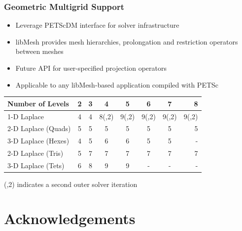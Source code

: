 \documentclass[mathserif]{beamer}
\begin{document}
\begin{frame}[fragile]
\frametitle{Geometric Multigrid Support}

\begin{itemize}

    \item Leverage PETScDM interface for solver infrastructure
    \item libMesh provides mesh hierarchies, prolongation and
        restriction operators between meshes
    \item Future API for user-specified projection operators
    \item Applicable to any libMesh-based application compiled with PETSc

\end{itemize}

      \begin{tabular}{l*{6}{c}r}
        Number of Levels  & 2 & 3 & 4 & 5 & 6  & 7 & 8 \\
        \hline
        1-D Laplace & 4 & 4 & 8(,2) & 9(,2) & 9(,2) & 9(,2) & 9(,2)\\
        2-D Laplace (Quads) & 5 & 5 & 5 & 5 & 5 & 5 & 5  \\
        3-D Laplace (Hexes) & 4 & 5 & 6 & 6 & 5 & 5 & -  \\
        2-D Laplace (Tris) & 5 & 7 & 7 & 7 & 7 & 7 & 7  \\
        3-D Laplace (Tets)  & 6 & 8 & 9 & 9 & - & - & -  \\
      \end{tabular}

      \vspace{1em}
      (,2) indicates a second outer solver iteration

\end{frame}



\section{Acknowledgements}
\end{document}
